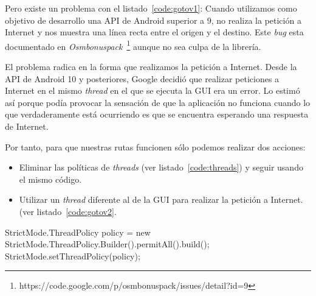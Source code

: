 Pero existe un problema con el listado~\ref{code:gotov1}: Cuando utilizamos como objetivo de
desarrollo una \acs{API} de Android superior a 9, no realiza la petición a Internet y nos muestra
una línea recta entre el origen y el destino. Este \emph{bug} esta documentado en
\emph{Osmbonuspack}~\footnote{https://code.google.com/p/osmbonuspack/issues/detail?id=9} aunque no
sea culpa de la librería.

El problema radica en la forma que realizamos la petición a Internet. Desde la \acs{API} de Android
10 y posteriores, Google decidió que realizar peticiones a Internet en el mismo \emph{thread} en
el que se ejecuta la \acf{GUI} era un error. Lo estimó así porque podía provocar la sensación de que
la aplicación no funciona cuando lo que verdaderamente está ocurriendo es que se encuentra esperando
una respuesta de Internet.

Por tanto, para que nuestras rutas funcionen sólo podemos realizar dos acciones:

\begin{itemize}
  \item Eliminar las políticas de \emph{threads} (ver listado~\ref{code:threads}) y seguir usando el
    mismo código.
  \item Utilizar un \emph{thread} diferente al de la \acs{GUI} para realizar la petición a Internet.
    (ver listado~\ref{code:gotov2}.
\end{itemize}


\begin{listing}[
  float=ht,
  language = java,
  caption  = {Eliminación de políticas de threads},
  label    = code:threads]
StrictMode.ThreadPolicy policy = new StrictMode.ThreadPolicy.Builder().permitAll().build();
StrictMode.setThreadPolicy(policy);
\end{listing}

